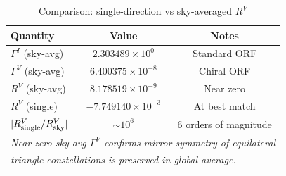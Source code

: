 \begin{table}[t]
\centering
\caption{Comparison: single-direction vs sky-averaged $R^V$}
\label{tab:sky_avg_comparison}
\begin{tabular}{lcc}
\hline\hline
\textbf{Quantity} & \textbf{Value} & \textbf{Notes} \\
\hline
$\Gamma^I$ (sky-avg) & $2.303489 \times 10^{0}$ & Standard ORF \\
$\Gamma^V$ (sky-avg) & $6.400375 \times 10^{-8}$ & Chiral ORF \\
$R^V$ (sky-avg) & $8.178519 \times 10^{-9}$ & Near zero \\
$R^V$ (single) & $-7.749140 \times 10^{-3}$ & At best match \\
$|R^V_{\rm single} / R^V_{\rm sky}|$ & $\sim 10^{6}$ & 6 orders of magnitude \\
\hline\hline
\multicolumn{3}{l}{\textit{Near-zero sky-avg $\Gamma^V$ confirms mirror symmetry of equilateral}} \\
\multicolumn{3}{l}{\textit{triangle constellations is preserved in global average.}} \\
\hline\hline
\end{tabular}
\end{table}
